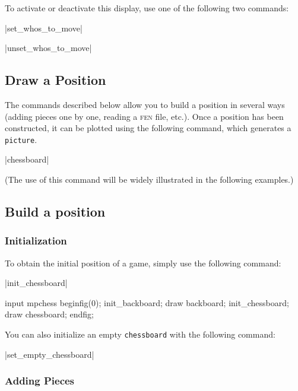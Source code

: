 \documentclass[english]{ltxdoc}
\begin{document}
To activate or deactivate this display, use one of the following two
commands:

\commande|set_whos_to_move|\smallskip


\commande|unset_whos_to_move|\smallskip

\subsection{Draw a Position}

The commands described below allow you to build a position in several ways
(adding pieces one by one, reading a \textsc{fen} file, etc.). Once a position
has been constructed, it can be plotted 
using the following command, which generates a \MP{} \lstinline+picture+.


\commande|chessboard|\smallskip \label{com:chessboard}

(The use of this command will be widely illustrated in the following examples.)

\subsection{Build a position}

\subsubsection{Initialization}

To obtain the initial position of a game, simply use the following command:

\commande|init_chessboard|\smallskip

\begin{ExempleMP}
input mpchess
beginfig(0);
init_backboard;
draw backboard;
init_chessboard;
draw chessboard;
endfig;
\end{ExempleMP}

You can also initialize an empty \lstinline+chessboard+ with the following command:

\commande|set_empty_chessboard|\smallskip

\subsubsection{Adding Pieces}
\end{document}
